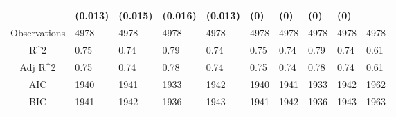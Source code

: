 \documentclass{article}
\begin{document}
\begin{table}[H]
\begin{tabular}{|clllllllll|}
   & (0.013) & (0.015) & (0.016) & (0.013) & (0) & (0) & (0) & (0) &  \\ 
  \hline 
 Observations & 4978 & 4978 & 4978 & 4978 & 4978 & 4978 & 4978 & 4978 & 4978 \\ 
  R^2 & 0.75 & 0.74 & 0.79 & 0.74 & 0.75 & 0.74 & 0.79 & 0.74 & 0.61 \\ 
  Adj R^2 & 0.75 & 0.74 & 0.78 & 0.74 & 0.75 & 0.74 & 0.78 & 0.74 & 0.61 \\ 
  AIC & 1940 & 1941 & 1933 & 1942 & 1940 & 1941 & 1933 & 1942 & 1962 \\ 
  BIC & 1941 & 1942 & 1936 & 1943 & 1941 & 1942 & 1936 & 1943 & 1963 \\ 
   \hline
\end{tabular}
 
\end{table}
\end{document}
